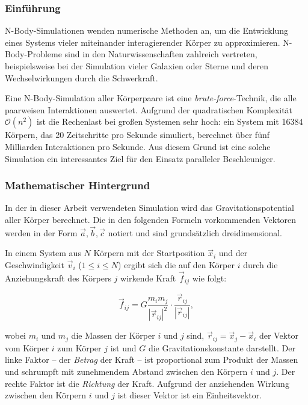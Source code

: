 \subsubsection{Einführung}
\label{methoden:nbody:einfuehrung}

N-Body-Simulationen wenden numerische Methoden an, um die Entwicklung eines
Systems vieler miteinander interagierender Körper zu approximieren.
N-Body-Probleme sind in den Naturwissenschaften zahlreich vertreten,
beispielsweise bei der Simulation vieler Galaxien oder Sterne und deren
Wechselwirkungen durch die Schwerkraft.

Eine N-Body-Simulation aller Körperpaare ist eine \textit{brute-force}-Technik,
die alle paarweisen Interaktionen auswertet. Aufgrund der quadratischen
Komplexität $\mathcal{O}(n^2)$ ist die Rechenlast bei großen Systemen sehr hoch:
ein System mit \num{16384} Körpern, das 20 Zeitschritte pro Sekunde simuliert,
berechnet über fünf Milliarden Interaktionen pro Sekunde. Aus diesem Grund ist
eine solche Simulation ein interessantes Ziel für den Einsatz paralleler
Beschleuniger.

\subsubsection{Mathematischer Hintergrund}
\label{methoden:nbody:mathematik}

In der in dieser Arbeit verwendeten Simulation wird das Gravitationspotential
aller Körper berechnet. Die in den folgenden Formeln vorkommenden Vektoren
werden in der Form $\vec{a}, \vec{b}, \vec{c}$ notiert und sind grundsätzlich
dreidimensional.

In einem System aus $N$ Körpern mit der Startposition $\vec{x}_i$ und der
Geschwindigkeit $\vec{v}_i$ ($1 \leq i \leq N$) ergibt sich die auf den Körper
$i$ durch die Anziehungskraft des Körpers $j$ wirkende Kraft $\vec{f}_{ij}$ wie
folgt:

\[
    \vec{f}_{ij} = G \frac{m_i m_j}{|\vec{r}_{ij}|^2} \cdot
                   \frac{\vec{r}_{ij}}{|\vec{r}_{ij}|},
\]

wobei $m_i$ und $m_j$ die Massen der Körper $i$ und $j$ sind,
$\vec{r}_{ij} = \vec{x}_j - \vec{x}_i$ der Vektor vom Körper $i$ zum Körper $j$
ist und $G$ die Gravitationskonstante darstellt. Der linke Faktor -- der
\textit{Betrag} der Kraft -- ist proportional zum Produkt der Massen und
schrumpft mit zunehmendem Abstand zwischen den Körpern $i$ und $j$. Der rechte
Faktor ist die \textit{Richtung} der Kraft. Aufgrund der anziehenden Wirkung
zwischen den Körpern $i$ und $j$ ist dieser Vektor ist ein Einheitsvektor.


